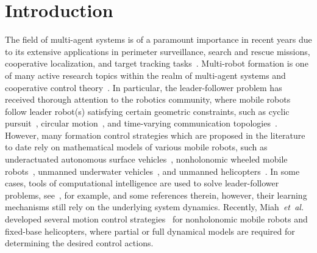 \documentclass[conference]{IEEEtran}
\begin{document}

\section{Introduction}
\label{sec:introduction}
The field of multi-agent systems %
is of a paramount importance in recent years due to its extensive applications in perimeter surveillance, search and rescue missions, cooperative localization, and target tracking tasks~\cite{Ma2019-Cooperative,Kia2018-ServerAssisted,Khan2018-Cooperative}. Multi-robot formation is one of many  active research topics within the realm of multi-agent systems and cooperative control theory~\cite{Oh2015-Survey}. In particular, the leader-follower problem has received thorough attention to the robotics community, where mobile robots follow leader robot(s) satisfying certain geometric constraints, such as cyclic pursuit~\cite{Yu2019-Cooperative,Marshall2004}, circular motion~\cite{Ma2019-Cooperative}, and time-varying communication topologies~\cite{Sakai208-Leader,Li2019-TimeVarying}. However,  many formation control strategies which are proposed in the literature to date rely on mathematical models of various mobile robots, such as underactuated autonomous surface vehicles~\cite{Liu2017-Modular}, nonholonomic wheeled mobile robots~\cite{Miao2018-Distributed}, unmanned underwater vehicles~\cite{Liu2019-Robust,Bechlioulis2019-Robust}, and unmanned helicopters~\cite{Kuo2019-Intelligent}.  In some cases, tools of computational intelligence are used to solve leader-follower problems, see~\cite{Xiao2019-LeaderFollower, Kuo2019-Intelligent}, for example, and some references therein, however, their learning mechanisms still rely on the underlying system dynamics. Recently, Miah~\textit{et~al.} developed several motion control strategies~\cite{MiKaCh2019-j1,MiKn2018-j1,MiFaChGu2017-j1,MiGu2015-j1,MiGu2014-j1} for nonholonomic mobile robots and fixed-base helicopters, where partial or full dynamical models are required for determining the desired control actions. 
\end{document}
